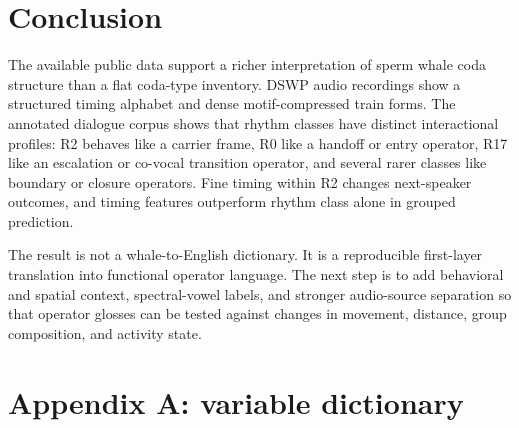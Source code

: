 \documentclass[11pt]{article}
\begin{document}
\section{Conclusion}

The available public data support a richer interpretation of sperm whale coda structure than a flat coda-type inventory. DSWP audio recordings show a structured timing alphabet and dense motif-compressed train forms. The annotated dialogue corpus shows that rhythm classes have distinct interactional profiles: R2 behaves like a carrier frame, R0 like a handoff or entry operator, R17 like an escalation or co-vocal transition operator, and several rarer classes like boundary or closure operators. Fine timing within R2 changes next-speaker outcomes, and timing features outperform rhythm class alone in grouped prediction.

The result is not a whale-to-English dictionary. It is a reproducible first-layer translation into functional operator language. The next step is to add behavioral and spatial context, spectral-vowel labels, and stronger audio-source separation so that operator glosses can be tested against changes in movement, distance, group composition, and activity state.

\appendix

\section{Appendix A: variable dictionary}
\end{document}
